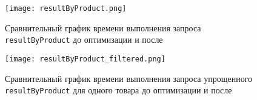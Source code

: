 \begin{figure}
	\centering
	\texttt{[image: resultByProduct.png]}
	\caption{Сравнительный график времени выполнения запроса \lstinline{resultByProduct} до оптимизации и после}
	\label{fig:summary:result_by_product}
\end{figure}

\begin{figure}
	\centering
	\texttt{[image: resultByProduct\_filtered.png]}
	\caption{Сравнительный график времени выполнения запроса упрощенного  \lstinline{resultByProduct} для одного товара до оптимизации и после}
	\label{fig:summary:result_by_product_filtered}
\end{figure}
